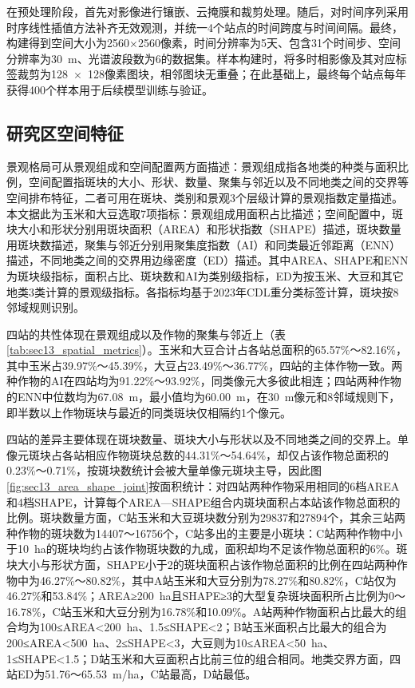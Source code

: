 在预处理阶段，首先对影像进行镶嵌、云掩膜和裁剪处理。随后，对时间序列采用时序线性插值方法补齐无效观测，并统一4个站点的时间跨度与时间间隔。最终，构建得到空间大小为2560$\times$2560像素，时间分辨率为5天、包含31个时间步、空间分辨率为30~m、光谱波段数为6的数据集。样本构建时，将多时相影像及其对应标签裁剪为128~$\times$~128像素图块，相邻图块无重叠；在此基础上，最终每个站点每年获得400个样本用于后续模型训练与验证。

\subsection{研究区空间特征}

景观格局可从景观组成和空间配置两方面描述：景观组成指各地类的种类与面积比例，空间配置指斑块的大小、形状、数量、聚集与邻近以及不同地类之间的交界等空间排布特征，二者可用在斑块、类别和景观3个层级计算的景观指数定量描述\citep{mcgarigal2023fragstats}。本文据此为玉米和大豆选取7项指标：景观组成用面积占比描述；空间配置中，斑块大小和形状分别用斑块面积（AREA）和形状指数（SHAPE）描述，斑块数量用斑块数描述，聚集与邻近分别用聚集度指数（AI）和同类最近邻距离（ENN）描述，不同地类之间的交界用边缘密度（ED）描述。其中AREA、SHAPE和ENN为斑块级指标，面积占比、斑块数和AI为类别级指标，ED为按玉米、大豆和其它地类3类计算的景观级指标。各指标均基于2023年CDL重分类标签计算，斑块按8邻域规则识别。

四站的共性体现在景观组成以及作物的聚集与邻近上（表\ref{tab:sec13_spatial_metrics}）。玉米和大豆合计占各站总面积的65.57\%～82.16\%，其中玉米占39.97\%～45.39\%，大豆占23.49\%～36.77\%，四站的主体作物一致。两种作物的AI在四站均为91.22\%～93.92\%，同类像元大多彼此相连；四站两种作物的ENN中位数均为67.08~m，最小值均为60.00~m，在30~m像元和8邻域规则下，即半数以上作物斑块与最近的同类斑块仅相隔约1个像元。

四站的差异主要体现在斑块数量、斑块大小与形状以及不同地类之间的交界上。单像元斑块占各站相应作物斑块总数的44.31\%～54.64\%，却仅占该作物总面积的0.23\%～0.71\%，按斑块数统计会被大量单像元斑块主导，因此图\ref{fig:sec13_area_shape_joint}按面积统计：对四站两种作物采用相同的6档AREA和4档SHAPE，计算每个AREA—SHAPE组合内斑块面积占本站该作物总面积的比例。斑块数量方面，C站玉米和大豆斑块数分别为29837和27894个，其余三站两种作物的斑块数为14407～16756个，C站多出的主要是小斑块：C站两种作物中小于10~ha的斑块均约占该作物斑块数的九成，面积却均不足该作物总面积的6\%。斑块大小与形状方面，SHAPE小于2的斑块面积占该作物总面积的比例在四站两种作物中为46.27\%～80.82\%，其中A站玉米和大豆分别为78.27\%和80.82\%，C站仅为46.27\%和53.84\%；AREA≥200~ha且SHAPE≥3的大型复杂斑块面积所占比例为0～16.78\%，C站玉米和大豆分别为16.78\%和10.09\%。A站两种作物面积占比最大的组合均为100≤AREA<200~ha、1.5≤SHAPE<2；B站玉米面积占比最大的组合为200≤AREA<500~ha、2≤SHAPE<3，大豆则为10≤AREA<50~ha、1≤SHAPE<1.5；D站玉米和大豆面积占比前三位的组合相同。地类交界方面，四站ED为51.76～65.53~m/ha，C站最高，D站最低。

